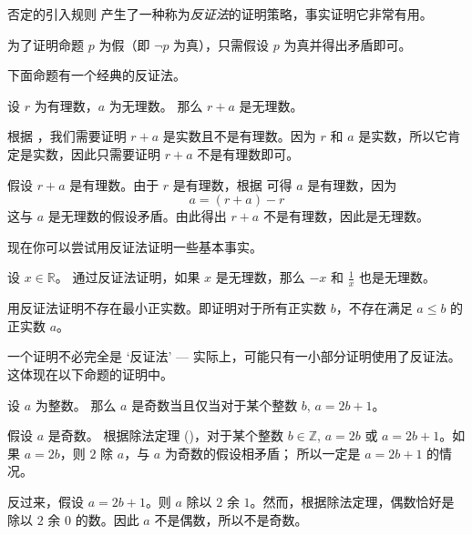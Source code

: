 否定的引入规则 \introrule{\neg} 产生了一种称为\textit{反证法}的证明策略，事实证明它非常有用。

\begin{strategy}
\label{strProvingNegationsDirect}
\label{strProofByContradictionDirect}
为了证明命题 $p$ 为假（即 $\neg p$ 为真），只需假设 $p$ 为真并得出矛盾即可。
\end{strategy}

下面命题有一个经典的反证法。

\begin{proposition}
设 $r$ 为有理数，$a$ 为无理数。 那么 $r+a$ 是无理数。
\end{proposition}

\begin{cproof}
根据 ，我们需要证明 $r+a$ 是实数且不是有理数。因为 $r$ 和 $a$ 是实数，所以它肯定是实数，因此只需要证明 $r+a$ 不是有理数即可。

假设 $r+a$ 是有理数。由于 $r$ 是有理数，根据  可得 $a$ 是有理数，因为
\[
a = (r+a) - r
\]
这与 $a$ 是无理数的假设矛盾。由此得出 $r+a$ 不是有理数，因此是无理数。
\end{cproof}

现在你可以尝试用反证法证明一些基本事实。

\begin{exercise}
\label{exNegationAndReciprocalOfIrrationalNumbers}
设 $x \in \mathbb{R}$。 通过反证法证明，如果 $x$ 是无理数，那么 $-x$ 和 $\frac{1}{x}$ 也是无理数。
\end{exercise}

\begin{exercise}
\label{exNoLeastPositiveReal}
用反证法证明不存在最小正实数。即证明对于所有正实数 $b$，不存在满足 $a\le b$ 的正实数 $a$。
\end{exercise}

一个证明不必完全是 `反证法' --- 实际上，可能只有一小部分证明使用了反证法。这体现在以下命题的证明中。

\begin{proposition}
\label{propOddIffRemainderOfOne}
设 $a$ 为整数。 那么 $a$ 是奇数当且仅当对于某个整数 $b$, $a=2b+1$。
\end{proposition}
\begin{cproof}
假设 $a$ 是奇数。 根据除法定理 ()，对于某个整数 $b \in \mathbb{Z}$, $a=2b$ 或 $a=2b+1$。如果 $a=2b$，则 $2$ 除 $a$，与 $a$ 为奇数的假设相矛盾； 所以一定是 $a=2b+1$ 的情况。

反过来，假设 $a=2b+1$。则 $a$ 除以 $2$ 余 $1$。然而，根据除法定理，偶数恰好是除以 $2$ 余 $0$ 的数。因此 $a$ 不是偶数，所以不是奇数。
\end{cproof}

